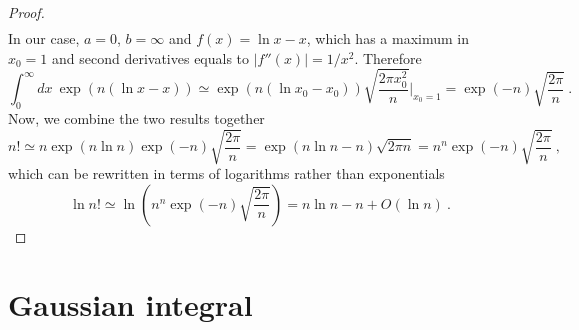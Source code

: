 \begin{proof}
\begin{equation*}
\begin{aligned}
        \end{aligned}
        \end{equation*}
        In our case, $a=0$, $b=\infty$ and $f(x) = \ln x - x$, which has a maximum in $x_0 = 1$ and second derivatives equals to $|f''(x)| = 1 / x^2$. Therefore
        \begin{equation*}
            \int_0^\infty dx ~ \exp(n (\ln x - x)) \simeq \exp(n (\ln x_0 - x_0)) \sqrt{\frac{2\pi x_0^2}{n}} \Big \vert_{x_0 = 1} = \exp(- n) \sqrt{\frac{2\pi}{n}} ~.
        \end{equation*}
        Now, we combine the two results together
        \begin{equation*}
            n! \simeq n \exp(n \ln n) \exp(- n) \sqrt{\frac{2\pi}{n}} = \exp(n \ln n - n) \sqrt{2 \pi n} = n^n \exp(-n) \sqrt{\frac{2\pi}{n}} ~,
        \end{equation*}
        which can be rewritten in terms of logarithms rather than exponentials 
        \begin{equation*}
            \ln n! \simeq \ln (n^n \exp(-n) \sqrt{\frac{2\pi}{n}} ) = n \ln n - n + O(\ln n) ~.
        \end{equation*}
    \end{proof}

\chapter{Gaussian integral}

